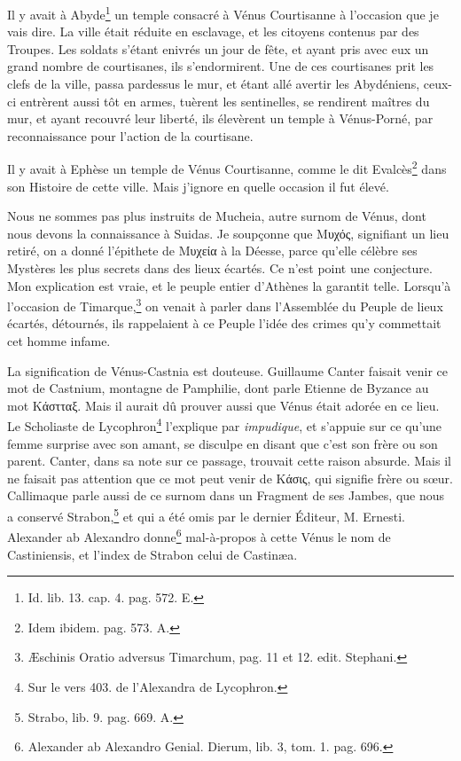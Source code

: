 \documentclass[a4paper, 11pt, oneside, polutonikogreek, french]{article}
\begin{document}
Il y avait à Abyde\footnote{Id. lib. 13. cap. 4. pag. 572. E.} un temple consacré à Vénus Courtisanne à l'occasion que je vais dire. La ville était réduite en esclavage, et les citoyens contenus par des Troupes. Les soldats s'étant enivrés un jour de fête, et ayant pris avec eux un grand nombre de courtisanes, ils s'endormirent. Une de ces courtisanes prit les clefs de la ville, passa pardessus le mur, et étant allé avertir les Abydéniens, ceux-ci entrèrent aussi tôt en armes, tuèrent les sentinelles, se rendirent maîtres du mur, et ayant recouvré leur liberté, ils élevèrent un temple à Vénus-Porné, par reconnaissance pour l'action de la courtisane.

Il y avait à Ephèse un temple de Vénus Courtisanne, comme le dit Evalcès\footnote{Idem ibidem. pag. 573. A.} dans son Histoire de cette ville. Mais j'ignore en quelle occasion il fut élevé.

Nous ne sommes pas plus instruits de Mucheia, autre surnom de Vénus, dont nous devons la connaissance à Suidas. Je soupçonne que Μυχός, signifiant un lieu retiré, on a donné l'épithete de Μυχεία à la Déesse, parce qu'elle célèbre ses Mystères les plus secrets dans des lieux écartés. Ce n'est point une conjecture. Mon explication est vraie, et le peuple entier d'Athènes la garantit telle. Lorsqu'à l'occasion de Timarque,\footnote{Æschinis Oratio adversus Timarchum, pag. 11 et 12. edit. Stephani.} on venait à parler dans l'Assemblée du Peuple de lieux écartés, détournés, ils rappelaient à ce Peuple l'idée des crimes qu'y commettait cet homme infame.

La signification de Vénus-Castnia est douteuse. Guillaume Canter faisait venir ce mot de Castnium, montagne de Pamphilie, dont parle Etienne de Byzance au mot Κάστταξ. Mais il aurait dû prouver aussi que Vénus était adorée en ce lieu. Le Scholiaste de Lycophron\footnote{Sur le vers 403. de l'Alexandra de Lycophron.} l'explique par \emph{impudique}, et s'appuie sur ce qu'une femme surprise avec son amant, se disculpe en disant que c'est son frère ou son parent. Canter, dans sa note sur ce passage, trouvait cette raison absurde. Mais il ne faisait pas attention que ce mot peut venir de Κάσις, qui signifie frère ou sœur. Callimaque parle aussi de ce surnom dans un Fragment de ses Jambes, que nous a conservé Strabon,\footnote{Strabo, lib. 9. pag. 669. A.} et qui a été omis par le dernier Éditeur, M. Ernesti. Alexander ab Alexandro donne\footnote{Alexander ab Alexandro Genial. Dierum, lib. 3, tom. 1. pag. 696.} mal-à-propos à cette Vénus le nom de Castiniensis, et l'index de Strabon celui de Castinæa.
\end{document}
